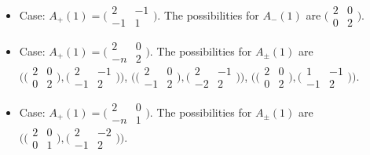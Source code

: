 \documentclass[pdftex]{sigma}
\numberwithin{equation}{section}
\theoremstyle{definition}
\begin{document}
\begin{itemize}
\item Case: $A_+(1) =
 \bigl(\begin{smallmatrix}
 2 & -1 \\
 -1 & 1
\end{smallmatrix}\bigr)$.
 The possibilities for $A_-(1)$ are $\bigl(\begin{smallmatrix}
 2 & 0 \\
 0 & 2
\end{smallmatrix}\bigr)$.

\item Case: $A_+(1) =
 \bigl(\!\begin{smallmatrix}
 2 & 0 \\
 -n & 2
\end{smallmatrix}\bigr)$.
 The possibilities for $A_\pm(1)$ are
$
\bigl(\bigl(\begin{smallmatrix}
 2 & 0 \\
 0 & 2
\end{smallmatrix}\bigr),
\bigl(\!\begin{smallmatrix}
 2 & -1 \\
 -1 & 2
 \end{smallmatrix}\bigr)\bigr)$, $
\bigl(\bigl(\begin{smallmatrix}
 2 & 0 \\
 -1 & 2
\end{smallmatrix}\bigr),
\bigl(\!\begin{smallmatrix}
 2 & -1 \\
 -2 & 2
 \end{smallmatrix}\bigr)\bigr)$, $
\bigl(\bigl(\begin{smallmatrix}
 2 & 0 \\
 0 & 2
\end{smallmatrix}\bigr),
\bigl(\begin{smallmatrix}
 1 & -1 \\
 -1 & 2
 \end{smallmatrix}\bigr)\bigr)$.

\item Case: $A_+(1) =
\bigl(\begin{smallmatrix}
 2 & 0 \\
 -n & 1
\end{smallmatrix}\bigr)$.
 The possibilities for $A_\pm(1)$ are
$\bigl( \bigl(\begin{smallmatrix}
 2 & 0 \\
 0 & 1
 \end{smallmatrix}\bigr),
\bigl(\begin{smallmatrix}
 2 & -2 \\
 -1 & 2
 \end{smallmatrix}\bigr)\bigr)$.


\end{itemize}
\end{document}
